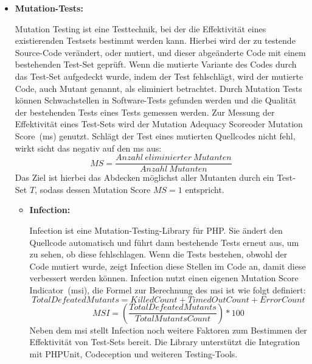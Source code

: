 \begin{itemize}
    \item {
        \textbf{Mutation-Tests:}\par
        Mutation Testing ist eine Testtechnik, bei der die Effektivität eines existierenden Testsets bestimmt werden
        kann.
        Hierbei wird der zu testende Source-Code verändert, oder mutiert, und dieser abgeänderte Code mit einem
        bestehenden Test-Set geprüft.
        Wenn die mutierte Variante des Codes durch das Test-Set aufgedeckt wurde, indem der Test fehlschlägt, wird
        der mutierte Code, auch Mutant genannt, als eliminiert betrachtet.
        Durch Mutation Tests können Schwachstellen in Software-Tests gefunden werden und die Qualität der bestehenden
        Tests eines Tests gemessen werden.
        Zur Messung der Effektivität eines Test-Sets wird der \glqq Mutation Adequacy Score\grqq\@ oder
        \glqq Mutation Score\grqq\ (\acrshort{ms}) genutzt.
        Schlägt der Test eines mutierten Quellcodes nicht fehl, wirkt sicht das negativ auf den \acrshort{ms} aus:
        \[MS = \frac{Anzahl\ eliminierter\ Mutanten}{Anzahl\ Mutanten}\]
        Das Ziel ist hierbei das Abdecken möglichst aller Mutanten durch ein Test-Set $T$, sodass dessen Mutation Score
        $MS = 1$ entspricht.

        \begin{itemize}
            \item {
                \textbf{Infection:}\par
                Infection ist eine Mutation-Testing-Library für PHP.
                Sie ändert den Quellcode automatisch und führt dann bestehende Tests erneut aus, um zu sehen, ob diese
                fehlschlagen.
                Wenn die Tests bestehen, obwohl der Code mutiert wurde, zeigt Infection diese Stellen im Code an, damit
                diese verbessert werden können.
                Infection nutzt einen eigenen \glqq Mutation Score Indicator\grqq\ (\acrshort{msi}), die Formel zur
                Berechnung des \acrshort{msi} ist wie folgt definiert:
                \[TotalDefeatedMutants = KilledCount + TimedOutCount + ErrorCount\]
                \[MSI = \left(\frac{TotalDefeatedMutants}{TotalMutantsCount}\right) * 100\]
                Neben dem \acrshort{msi} stellt Infection noch weitere Faktoren zum Bestimmen der Effektivität von
                Test-Sets bereit.
                Die Library unterstützt die Integration mit PHPUnit, Codeception und weiteren Testing-Tools.
            }
        \end{itemize}
    }
\end{itemize}

